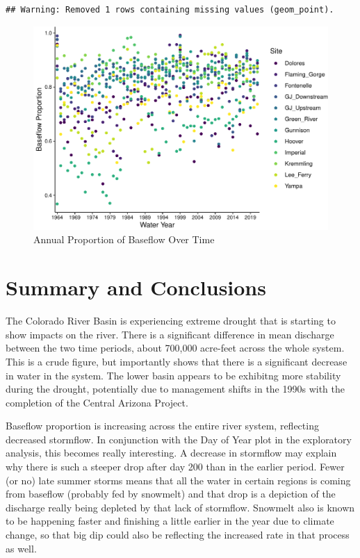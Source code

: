 \documentclass[
  12pt,
]{article}
\begin{document}
\begin{verbatim}
## Warning: Removed 1 rows containing missing values (geom_point).
\end{verbatim}

\begin{figure}

\includegraphics{WDA_final_project_files/figure-latex/Proportion of Baseflow-1} \hfill{}

\caption{Annual Proportion of Baseflow Over Time}\label{fig:Proportion of Baseflow}
\end{figure}

\newpage

\hypertarget{summary-and-conclusions}{%
\section{Summary and Conclusions}\label{summary-and-conclusions}}

The Colorado River Basin is experiencing extreme drought that is
starting to show impacts on the river. There is a significant difference
in mean discharge between the two time periods, about 700,000 acre-feet
across the whole system. This is a crude figure, but importantly shows
that there is a significant decrease in water in the system. The lower
basin appears to be exhibitng more stability during the drought,
potentially due to management shifts in the 1990s with the completion of
the Central Arizona Project.

Baseflow proportion is increasing across the entire river system,
reflecting decreased stormflow. In conjunction with the Day of Year plot
in the exploratory analysis, this becomes really interesting. A decrease
in stormflow may explain why there is such a steeper drop after day 200
than in the earlier period. Fewer (or no) late summer storms means that
all the water in certain regions is coming from baseflow (probably fed
by snowmelt) and that drop is a depiction of the discharge really being
depleted by that lack of stormflow. Snowmelt also is known to be
happening faster and finishing a little earlier in the year due to
climate change, so that big dip could also be reflecting the increased
rate in that process as well.
\end{document}
